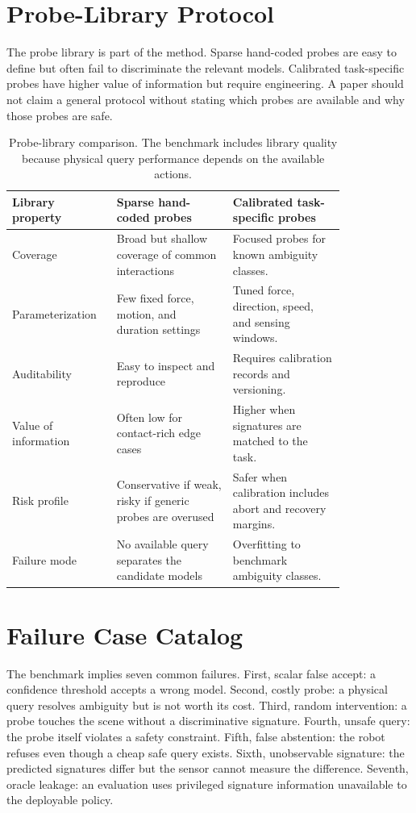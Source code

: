 \documentclass{article}
\begin{document}
\section{Probe-Library Protocol}

The probe library is part of the method. Sparse hand-coded probes are easy to define but often fail to discriminate the relevant models. Calibrated task-specific probes have higher value of information but require engineering. A paper should not claim a general protocol without stating which probes are available and why those probes are safe.

\begin{table}[p]
\centering
\small
\begin{tabular}{p{0.21\linewidth}p{0.31\linewidth}p{0.30\linewidth}}
\toprule
Library property & Sparse hand-coded probes & Calibrated task-specific probes \\
\midrule
Coverage & Broad but shallow coverage of common interactions & Focused probes for known ambiguity classes. \\
Parameterization & Few fixed force, motion, and duration settings & Tuned force, direction, speed, and sensing windows. \\
Auditability & Easy to inspect and reproduce & Requires calibration records and versioning. \\
Value of information & Often low for contact-rich edge cases & Higher when signatures are matched to the task. \\
Risk profile & Conservative if weak, risky if generic probes are overused & Safer when calibration includes abort and recovery margins. \\
Failure mode & No available query separates the candidate models & Overfitting to benchmark ambiguity classes. \\
\bottomrule
\end{tabular}
\caption{Probe-library comparison. The benchmark includes library quality because physical query performance depends on the available actions.}
\label{tab:library_comparison}
\end{table}

\section{Failure Case Catalog}

The benchmark implies seven common failures. First, scalar false accept: a confidence threshold accepts a wrong model. Second, costly probe: a physical query resolves ambiguity but is not worth its cost. Third, random intervention: a probe touches the scene without a discriminative signature. Fourth, unsafe query: the probe itself violates a safety constraint. Fifth, false abstention: the robot refuses even though a cheap safe query exists. Sixth, unobservable signature: the predicted signatures differ but the sensor cannot measure the difference. Seventh, oracle leakage: an evaluation uses privileged signature information unavailable to the deployable policy.
\end{document}
